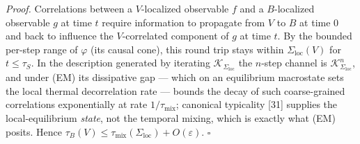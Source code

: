 \documentclass[
]{article}
\begin{document}
\emph{Proof.} Correlations between a \(V\)-localized observable \(f\)
and a \(B\)-localized observable \(g\) at time \(t\) require information
to propagate from \(V\) to \(B\) at time \(0\) and back to influence the
\(V\)-correlated component of \(g\) at time \(t\). By the bounded
per-step range of \(\varphi\) (its causal cone), this round trip stays
within \(\Sigma_{\text{loc}}(V)\) for \(t \leq \tau_S\). In the
description generated by iterating \(\mathcal{K}_{\Sigma_{\text{loc}}}\)
the \(n\)-step channel is \(\mathcal{K}_{\Sigma_{\text{loc}}}^n\), and
under (EM) its dissipative gap --- which on an equilibrium macrostate
sets the local thermal decorrelation rate --- bounds the decay of such
coarse-grained correlations exponentially at rate
\(1/\tau_{\text{mix}}\); canonical typicality {[}31{]} supplies the
local-equilibrium \emph{state}, not the temporal mixing, which is
exactly what (EM) posits. Hence
\(\tau_B(V) \leq \tau_{\text{mix}}(\Sigma_{\text{loc}}) + O(\varepsilon)\).
\(\square\)
\end{document}
